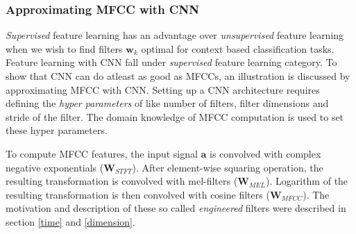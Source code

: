 \subsubsection{Approximating MFCC with CNN}
\textit{Supervised} feature learning has an advantage over \textit{unsupervised} feature learning when we wish to find filters $\textbf{w}_{k}$ optimal for context based classification tasks. Feature learning with CNN fall under \textit{supervised} feature learning category.
To show that CNN can do atleast as good as MFCCs, an illustration is discussed by approximating MFCC with CNN. Setting up a CNN architecture requires defining the \textit{hyper parameters} of like number of filters, filter dimensions and stride of the filter. The domain knowledge of MFCC computation is used to set these hyper parameters.
\bigskip  

\noindent To compute MFCC features, the input signal $\textbf{a}$ is convolved with complex negative exponentials ($\textbf{W}_{STFT}$). After element-wise squaring operation, the resulting transformation is convolved with mel-filters ($\textbf{W}_{MEL}$). Logarithm of the resulting transformation is then convolved with cosine filters ($\textbf{W}_{MFCC}$). The motivation and description of these so called \textit{engineered} filters were described in section \ref{time} and \ref{dimension}. 

